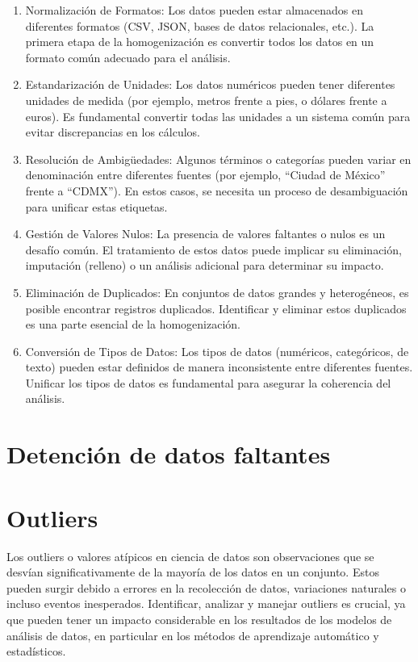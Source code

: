 \documentclass[
  us-letterpaper,
]{scrreprt}
\theoremstyle{plain}
\theoremstyle{plain}
\theoremstyle{definition}
\theoremstyle{remark}
\begin{document}
\begin{enumerate}
\def\labelenumi{\arabic{enumi}.}
\item
  Normalización de Formatos: Los datos pueden estar almacenados en
  diferentes formatos (CSV, JSON, bases de datos relacionales, etc.). La
  primera etapa de la homogenización es convertir todos los datos en un
  formato común adecuado para el análisis.
\item
  Estandarización de Unidades: Los datos numéricos pueden tener
  diferentes unidades de medida (por ejemplo, metros frente a pies, o
  dólares frente a euros). Es fundamental convertir todas las unidades a
  un sistema común para evitar discrepancias en los cálculos.
\item
  Resolución de Ambigüedades: Algunos términos o categorías pueden
  variar en denominación entre diferentes fuentes (por ejemplo, ``Ciudad
  de México'' frente a ``CDMX''). En estos casos, se necesita un proceso
  de desambiguación para unificar estas etiquetas.
\item
  Gestión de Valores Nulos: La presencia de valores faltantes o nulos es
  un desafío común. El tratamiento de estos datos puede implicar su
  eliminación, imputación (relleno) o un análisis adicional para
  determinar su impacto.
\item
  Eliminación de Duplicados: En conjuntos de datos grandes y
  heterogéneos, es posible encontrar registros duplicados. Identificar y
  eliminar estos duplicados es una parte esencial de la homogenización.
\item
  Conversión de Tipos de Datos: Los tipos de datos (numéricos,
  categóricos, de texto) pueden estar definidos de manera inconsistente
  entre diferentes fuentes. Unificar los tipos de datos es fundamental
  para asegurar la coherencia del análisis.
\end{enumerate}

\section{Detención de datos
faltantes}\label{detenciuxf3n-de-datos-faltantes}

\section{Outliers}\label{sec-outlier}

Los outliers o valores atípicos en ciencia de datos son observaciones
que se desvían significativamente de la mayoría de los datos en un
conjunto. Estos pueden surgir debido a errores en la recolección de
datos, variaciones naturales o incluso eventos inesperados. Identificar,
analizar y manejar outliers es crucial, ya que pueden tener un impacto
considerable en los resultados de los modelos de análisis de datos, en
particular en los métodos de aprendizaje automático y estadísticos.
\end{document}

